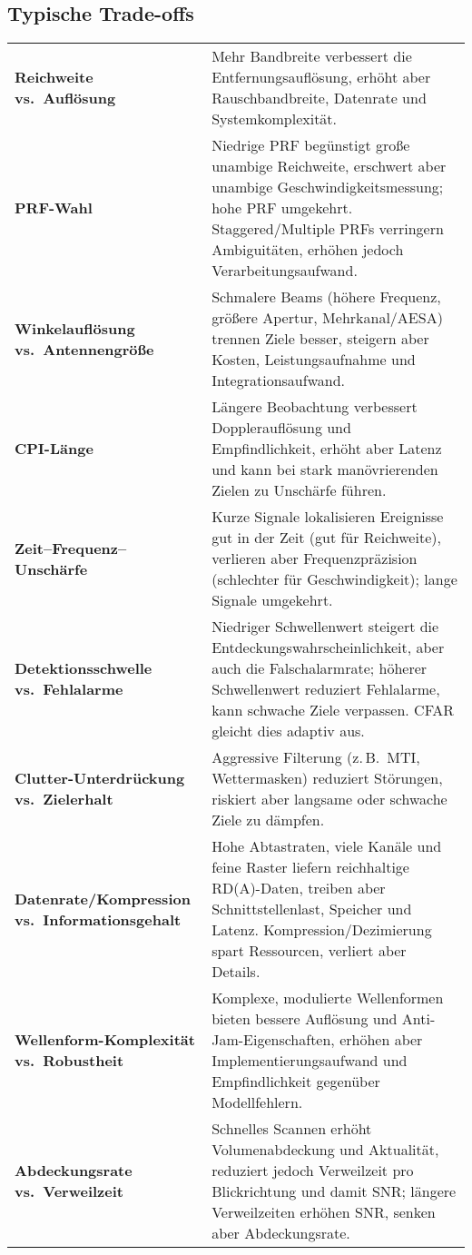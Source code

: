 \subsection{Typische Trade-offs}
\begin{tabular}{p{} p{}}
\textbf{Reichweite vs.\ Auflösung} & Mehr Bandbreite verbessert die Entfernungsauflösung, erhöht aber Rauschbandbreite, Datenrate und Systemkomplexität. \\[0.5em]
\textbf{PRF-Wahl} & Niedrige PRF begünstigt große unambige Reichweite, erschwert aber unambige Geschwindigkeitsmessung; hohe PRF umgekehrt. Staggered/Multiple PRFs verringern Ambiguitäten, erhöhen jedoch Verarbeitungsaufwand. \\[0.5em]
\textbf{Winkelauflösung vs.\ Antennengröße} & Schmalere Beams (höhere Frequenz, größere Apertur, Mehrkanal/AESA) trennen Ziele besser, steigern aber Kosten, Leistungsaufnahme und Integrationsaufwand. \\[0.5em]
\textbf{CPI-Länge} & Längere Beobachtung verbessert Dopplerauflösung und Empfindlichkeit, erhöht aber Latenz und kann bei stark manövrierenden Zielen zu Unschärfe führen. \\[0.5em]
\textbf{Zeit–Frequenz–Unschärfe} & Kurze Signale lokalisieren Ereignisse gut in der Zeit (gut für Reichweite), verlieren aber Frequenzpräzision (schlechter für Geschwindigkeit); lange Signale umgekehrt. \\[0.5em]
\textbf{Detektionsschwelle vs.\ Fehlalarme} & Niedriger Schwellenwert steigert die Entdeckungswahrscheinlichkeit, aber auch die Falschalarmrate; höherer Schwellenwert reduziert Fehlalarme, kann schwache Ziele verpassen. CFAR gleicht dies adaptiv aus. \\[0.5em]
\textbf{Clutter-Unterdrückung vs.\ Zielerhalt} & Aggressive Filterung (z.\,B.\ MTI, Wettermasken) reduziert Störungen, riskiert aber langsame oder schwache Ziele zu dämpfen. \\[0.5em]
\textbf{Datenrate/Kompression vs.\ Informationsgehalt} & Hohe Abtastraten, viele Kanäle und feine Raster liefern reichhaltige RD(A)-Daten, treiben aber Schnittstellenlast, Speicher und Latenz. Kompression/Dezimierung spart Ressourcen, verliert aber Details. \\[0.5em]
\textbf{Wellenform-Komplexität vs.\ Robustheit} & Komplexe, modulierte Wellenformen bieten bessere Auflösung und Anti-Jam-Eigenschaften, erhöhen aber Implementierungsaufwand und Empfindlichkeit gegenüber Modellfehlern. \\[0.5em]
\textbf{Abdeckungsrate vs.\ Verweilzeit} & Schnelles Scannen erhöht Volumenabdeckung und Aktualität, reduziert jedoch Verweilzeit pro Blickrichtung und damit SNR; längere Verweilzeiten erhöhen SNR, senken aber Abdeckungsrate. \\
\end{tabular}

